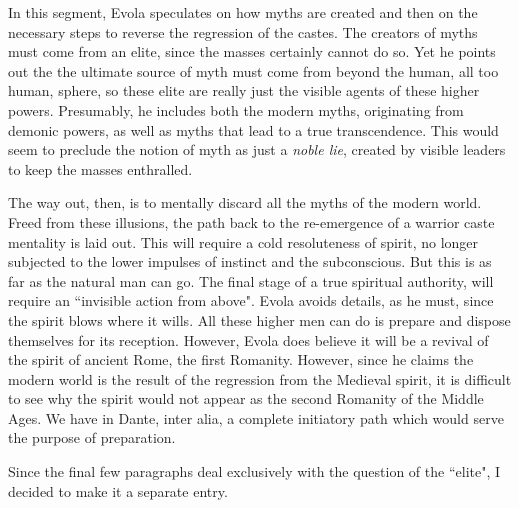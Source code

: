 \begin{quotex}
In this segment, Evola speculates on how myths are created and then on the necessary steps to reverse the regression of the castes. The creators of myths must come from an elite, since the masses certainly cannot do so. Yet he points out the the ultimate source of myth must come from beyond the human, all too human, sphere, so these elite are really just the visible agents of these higher powers. Presumably, he includes both the modern myths, originating from demonic powers, as well as myths that lead to a true transcendence. This would seem to preclude the notion of myth as just a \emph{noble lie}, created by visible leaders to keep the masses enthralled.

The way out, then, is to mentally discard all the myths of the modern world. Freed from these illusions, the path back to the re-emergence of a warrior caste mentality is laid out. This will require a cold resoluteness of spirit, no longer subjected to the lower impulses of instinct and the subconscious. But this is as far as the natural man can go. The final stage of a true spiritual authority, will require an ``invisible action from above". Evola avoids details, as he must, since the spirit blows where it wills. All these higher men can do is prepare and dispose themselves for its reception. However, Evola does believe it will be a revival of the spirit of ancient Rome, the first Romanity. However, since he claims the modern world is the result of the regression from the Medieval spirit, it is difficult to see why the spirit would not appear as the second Romanity of the Middle Ages. We have in Dante, inter alia, a complete initiatory path which would serve the purpose of preparation. 

Since the final few paragraphs deal exclusively with the question of the ``elite", I decided to make it a separate entry.

\end{quotex}
